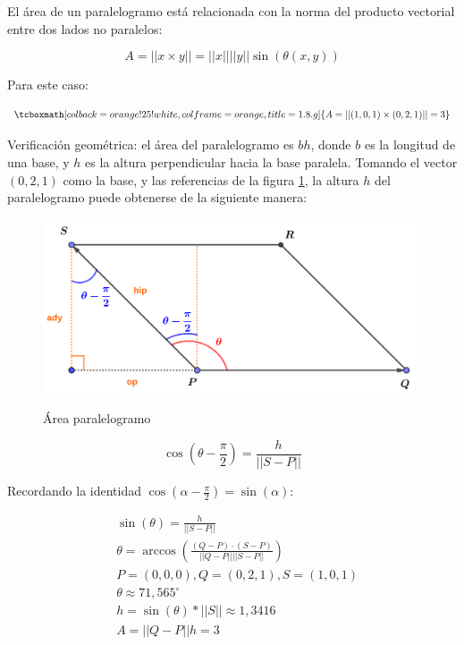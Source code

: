 \documentclass{article}
\begin{document}
El área de un paralelogramo está relacionada con la norma del producto vectorial entre dos lados no paralelos:

\begin{equation}
A = ||x \times y|| = ||x|| ||y|| \sin(\theta(x,y))
\end{equation}

Para este caso:

\begin{equation}
\tcboxmath[colback=orange!25!white,colframe=orange,title=1.8.g]
{ A = ||(1, 0, 1) \times (0, 2, 1)|| = 3 }
\end{equation}

Verificación geométrica: el área del paralelogramo es $b h$, donde $b$ es la longitud de una base, y $h$ es la altura perpendicular hacia la base paralela. Tomando el vector $(0, 2, 1)$ como la base, y las referencias de la figura \ref{fig:1-8-g}, la altura $h$ del paralelogramo puede obtenerse de la siguiente manera:

\begin{figure}[ht]
\caption{Área paralelogramo}
\includegraphics[scale=1]{img/exercises/guide_01/08_g.png} 
\centering
\label{fig:1-8-g}
\end{figure}

\begin{equation}
\cos \left( \theta - \frac{\pi}{2} \right) = \frac{h}{||S-P||}
\end{equation}

Recordando la identidad $\cos(\alpha - \frac{\pi}{2}) = \sin(\alpha)$:

\begin{subequations}
\begin{align}
& \sin(\theta) = \frac{h}{||S-P||} \\
& \theta = \arccos \left( \frac{(Q-P) \cdot (S-P)}{||Q-P|| ||S-P||} \right) \\
& P = (0,0,0), Q = (0,2,1), S = (1, 0, 1) \\
& \theta \approx 71,565^{\circ} \\
& h = \sin(\theta) * ||S|| \approx 1,3416 \\
& A = ||Q-P|| h = 3
\end{align}
\end{subequations}
\end{document}
